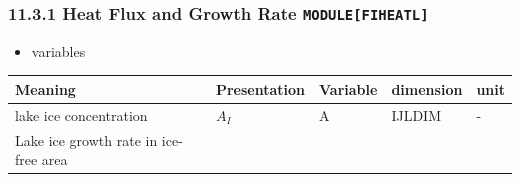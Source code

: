 \hypertarget{heat-flux-and-growth-rate-modulefiheatl}{%
\subsubsection{\texorpdfstring{11.3.1 Heat Flux and Growth Rate
\texttt{MODULE{[}FIHEATL{]}}}{11.3.1 Heat Flux and Growth Rate MODULE{[}FIHEATL{]}}}\label{heat-flux-and-growth-rate-modulefiheatl}}

\begin{itemize}
\tightlist
\item
  variables
\end{itemize}

\setlength\LTleft{0pt}\setlength\LTright{0pt}\begin{longtable}[]{@{}lllll@{}}
\toprule\relax
\begin{minipage}[b]{0.55\columnwidth}\raggedright
Meaning\strut
\end{minipage} & \begin{minipage}[b]{0.08\columnwidth}\raggedright
Presentation\strut
\end{minipage} & \begin{minipage}[b]{0.06\columnwidth}\raggedright
Variable\strut
\end{minipage} & \begin{minipage}[b]{0.13\columnwidth}\raggedright
dimension\strut
\end{minipage} & \begin{minipage}[b]{0.04\columnwidth}\raggedright
unit\strut
\end{minipage}\tabularnewline
\midrule\relax
\endhead
\begin{minipage}[t]{0.55\columnwidth}\raggedright
lake ice concentration\strut
\end{minipage} & \begin{minipage}[t]{0.08\columnwidth}\raggedright
\(A_I\)\strut
\end{minipage} & \begin{minipage}[t]{0.06\columnwidth}\raggedright
A\strut
\end{minipage} & \begin{minipage}[t]{0.13\columnwidth}\raggedright
IJLDIM\strut
\end{minipage} & \begin{minipage}[t]{0.04\columnwidth}\raggedright
-\strut
\end{minipage}\tabularnewline
\begin{minipage}[t]{0.55\columnwidth}\raggedright
Lake ice growth rate in ice-free area\strut

\end{minipage}
\end{longtable}

